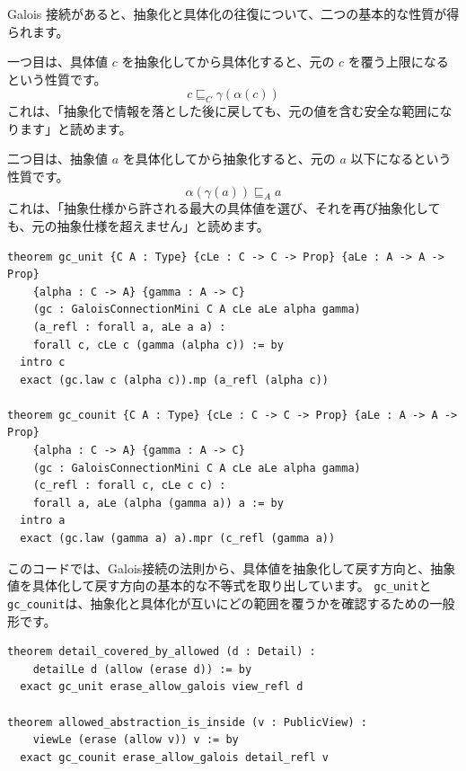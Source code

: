 Galois 接続があると、抽象化と具体化の往復について、二つの基本的な性質が得られます。

一つ目は、具体値 \(c\) を抽象化してから具体化すると、元の \(c\) を覆う上限になるという性質です。
\[
  c \sqsubseteq_C \gamma(\alpha(c))
\]
これは、「抽象化で情報を落とした後に戻しても、元の値を含む安全な範囲になります」と読めます。

二つ目は、抽象値 \(a\) を具体化してから抽象化すると、元の \(a\) 以下になるという性質です。
\[
  \alpha(\gamma(a)) \sqsubseteq_A a
\]
これは、「抽象仕様から許される最大の具体値を選び、それを再び抽象化しても、元の抽象仕様を超えません」と読めます。

\begin{listing}[htbp]
\begin{verbatim}
theorem gc_unit {C A : Type} {cLe : C -> C -> Prop} {aLe : A -> A -> Prop}
    {alpha : C -> A} {gamma : A -> C}
    (gc : GaloisConnectionMini C A cLe aLe alpha gamma)
    (a_refl : forall a, aLe a a) :
    forall c, cLe c (gamma (alpha c)) := by
  intro c
  exact (gc.law c (alpha c)).mp (a_refl (alpha c))

theorem gc_counit {C A : Type} {cLe : C -> C -> Prop} {aLe : A -> A -> Prop}
    {alpha : C -> A} {gamma : A -> C}
    (gc : GaloisConnectionMini C A cLe aLe alpha gamma)
    (c_refl : forall c, cLe c c) :
    forall a, aLe (alpha (gamma a)) a := by
  intro a
  exact (gc.law (gamma a) a).mpr (c_refl (gamma a))
\end{verbatim}
\caption{\texttt{gc\_unit} と \texttt{gc\_counit}}
\label{lst:ch22-galois-consequences}
\end{listing}

このコードでは、Galois接続の法則から、具体値を抽象化して戻す方向と、抽象値を具体化して戻す方向の基本的な不等式を取り出しています。
\texttt{gc\_unit}と\texttt{gc\_counit}は、抽象化と具体化が互いにどの範囲を覆うかを確認するための一般形です。

\begin{listing}[htbp]
\begin{verbatim}
theorem detail_covered_by_allowed (d : Detail) :
    detailLe d (allow (erase d)) := by
  exact gc_unit erase_allow_galois view_refl d

theorem allowed_abstraction_is_inside (v : PublicView) :
    viewLe (erase (allow v)) v := by
  exact gc_counit erase_allow_galois detail_refl v
\end{verbatim}
\caption{\texttt{detail\_covered\_by\_allowed}・\texttt{allowed\_abstraction\_is\_inside}}
\label{lst:ch22-galois-use}
\end{listing}

